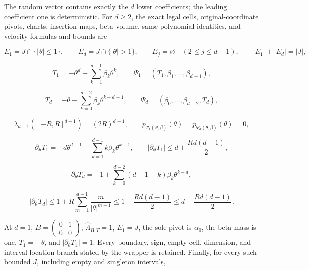 \begin{proposition}
   The random vector contains exactly the \(d\) lower coefficients; the leading coefficient one is
   deterministic. For \(d\geq2\), the exact legal cells, original-coordinate pivots, charts, insertion maps,
   beta volume, same-polynomial identities, and velocity formulas and bounds are
   
\begin{equation}
\label{eq:appendix-indented-048}
   E_1=J\cap\{\lvert\theta\rvert\leq1\},
   \qquad E_d=J\cap\{\lvert\theta\rvert>1\},
   \qquad E_j=\varnothing\quad(2\leq j\leq d-1),
   \qquad \lvert E_1\rvert+\lvert E_d\rvert=\lvert J\rvert,
\end{equation}
   
\begin{equation}
\label{eq:appendix-indented-049}
   T_1=-\theta^d-\sum_{k=1}^{d-1}\beta_k\theta^k,
   \qquad \Psi_1=(T_1,\beta_1,\ldots,\beta_{d-1}),
\end{equation}
   
\begin{equation}
\label{eq:appendix-indented-050}
   T_d=-\theta-\sum_{k=0}^{d-2}\beta_k\theta^{k-d+1},
   \qquad \Psi_d=(\beta_0,\ldots,\beta_{d-2},T_d),
\end{equation}
   
\begin{equation}
\label{eq:appendix-indented-051}
   \lambda_{d-1}([-R,R]^{d-1})=(2R)^{d-1},
   \qquad p_{\Psi_1(\theta,\beta)}(\theta)
   =p_{\Psi_d(\theta,\beta)}(\theta)=0,
\end{equation}
   
\begin{equation}
\label{eq:appendix-indented-052}
   \partial_\theta T_1
   =-d\theta^{d-1}-\sum_{k=1}^{d-1}k\beta_k\theta^{k-1},
   \qquad
   \lvert\partial_\theta T_1\rvert\leq d+\frac{Rd(d-1)}2,
\end{equation}
   
\begin{equation}
\label{eq:appendix-indented-053}
   \partial_\theta T_d
   =-1+\sum_{k=0}^{d-2}(d-1-k)\beta_k\theta^{k-d},
\end{equation}
   
\begin{equation}
\label{eq:appendix-indented-054}
   \lvert\partial_\theta T_d\rvert
   \leq1+R\sum_{m=1}^{d-1}\frac{m}{\lvert\theta\rvert^{m+1}}
   \leq1+\frac{Rd(d-1)}2
   \leq d+\frac{Rd(d-1)}2.
\end{equation}
   
   At \(d=1\), \(B=\left(\begin{smallmatrix}0&1\\0&0\end{smallmatrix}\right)\),
   \(\widehat\Lambda_{B,T}=1\), \(E_1=J\), the sole pivot is \(\alpha_0\), the beta mass is one,
   \(T_1=-\theta\), and \(\lvert\partial_\theta T_1\rvert=1\).
   Every boundary, sign, empty-cell, dimension, and interval-location branch stated by the wrapper is retained.
   Finally, for every such bounded \(J\), including empty and singleton intervals,
   

\end{proposition}
